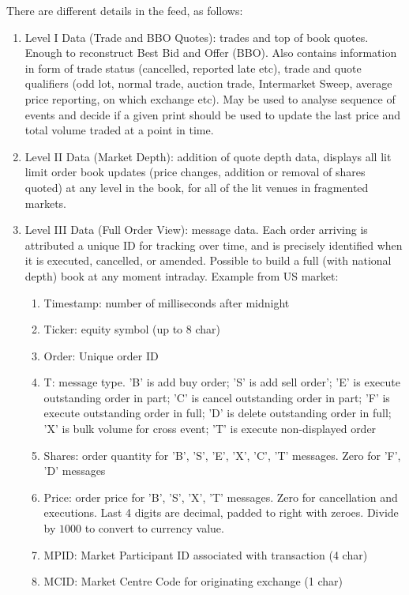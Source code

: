 There are different details in the  feed, as follows:
\begin{enumerate}[label=\roman*.]
\setlength{\itemsep}{0pt}
\item Level I Data (Trade and BBO Quotes): trades and top of book quotes. Enough to reconstruct Best Bid and Offer (BBO). Also contains information in form of trade status (cancelled, reported late etc), trade and quote qualifiers (odd lot, normal trade, auction trade, Intermarket Sweep, average price reporting, on which exchange etc). May be used to analyse sequence of events and decide if a given print should be used to update the last price and total volume traded at a point in time.
\item Level II Data (Market Depth): addition of quote depth data, displays all lit limit order book updates (price changes, addition or removal of shares quoted) at any level in the book, for all of the lit venues in fragmented markets.
\item Level III Data (Full Order View): message data. Each order arriving is attributed a unique ID for tracking over time, and is precisely identified when it is executed, cancelled, or amended. Possible to build a full (with national depth) book at any moment intraday. Example from US market:
\begin{enumerate}[label=\arabic*.]
\setlength{\itemsep}{0pt}
\item Timestamp: number of milliseconds after midnight
\item Ticker: equity symbol (up to 8 char)
\item Order: Unique order ID
\item T: message type. 'B' is add buy order; 'S' is add sell order'; 'E' is execute outstanding order in part; 'C' is cancel outstanding order in part; 'F' is execute outstanding order in full; 'D' is delete outstanding order in full; 'X' is bulk volume for cross event; 'T' is execute non-displayed order
\item Shares: order quantity for 'B', 'S', 'E', 'X', 'C', 'T' messages. Zero for 'F', 'D' messages
\item Price: order price for 'B', 'S', 'X', 'T' messages. Zero for cancellation and executions. Last 4 digits are decimal, padded to right with zeroes. Divide by $1000$ to convert to currency value.
\item MPID: Market Participant ID associated with transaction (4 char)
\item MCID: Market Centre Code for originating exchange (1 char)

\end{enumerate}
\end{enumerate}
